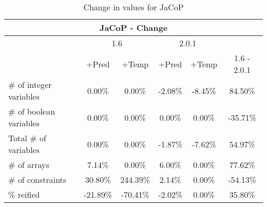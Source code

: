 \documentclass{standalone}
\begin{document}
\begin{table}[H]
\footnotesize
\centering
\begin{tabular}{lc|c|c|c|c}
\multicolumn{6}{c}{JaCoP - Change} \\ 
\hline\hline  & \multicolumn{2}{c|}{1.6} &\multicolumn{2}{c|}{2.0.1} &\\ 
\hline  & +Pred & +Temp & +Pred & +Temp & 1.6 - 2.0.1\\
\# of integer variables & 0.00\% & 0.00\% & -2.08\% & -8.45\% & 84.50\% \\ 
\# of boolean variables & 0.00\% & 0.00\% & 0.00\% & 0.00\% & -35.71\% \\
Total \# of variables   & 0.00\% & 0.00\% & -1.87\% & -7.62\% & 54.97\% \\
\# of arrays            & 7.14\% & 0.00\% & 6.00\% & 0.00\% & 77.62\% \\
\# of constraints       & 30.80\% & 244.39\% & 2.14\% & 0.00\% & -54.13\% \\ 
\% reified               & -21.89\% & -70.41\% & -2.02\% & 0.00\% & 35.80\%\\ 
\end{tabular}\caption{Change in values for JaCoP}
\end{table}
\end{document}
